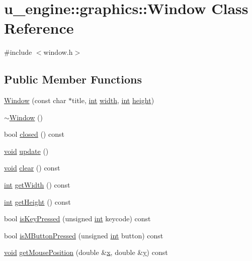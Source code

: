 \hypertarget{classu__engine_1_1graphics_1_1_window}{}\section{u\+\_\+engine\+:\+:graphics\+:\+:Window Class Reference}
\label{classu__engine_1_1graphics_1_1_window}


{\ttfamily \#include $<$window.\+h$>$}

\subsection*{Public Member Functions}
\begin{DoxyCompactItemize}
\item 
\hyperlink{classu__engine_1_1graphics_1_1_window_abffd9ce4556a8020292f0db6e86c4b7b}{Window} (const char $\ast$title, \hyperlink{wglew_8h_a500a82aecba06f4550f6849b8099ca21}{int} \hyperlink{glew_8h_aa105b18f96e6bc2485cb7f576a7fb9ba}{width}, \hyperlink{wglew_8h_a500a82aecba06f4550f6849b8099ca21}{int} \hyperlink{glew_8h_aa214bd63e12f7ddf524c83894fcc69a7}{height})
\item 
\hyperlink{classu__engine_1_1graphics_1_1_window_a8e30906139e8e91cceb32c50c2a44098}{$\sim$\+Window} ()
\item 
bool \hyperlink{classu__engine_1_1graphics_1_1_window_a96d6897109221d2147c9302b52e0e860}{closed} () const 
\item 
\hyperlink{wglew_8h_aeea6e3dfae3acf232096f57d2d57f084}{void} \hyperlink{classu__engine_1_1graphics_1_1_window_a498d5b982b6b7589653a3f60686c089c}{update} ()
\item 
\hyperlink{wglew_8h_aeea6e3dfae3acf232096f57d2d57f084}{void} \hyperlink{classu__engine_1_1graphics_1_1_window_a1bd69497bd45d1265b0bf3bc07f086c4}{clear} () const 
\item 
\hyperlink{wglew_8h_a500a82aecba06f4550f6849b8099ca21}{int} \hyperlink{classu__engine_1_1graphics_1_1_window_aff46afa2292ddca01e3e02fbe37e0173}{get\+Width} () const 
\item 
\hyperlink{wglew_8h_a500a82aecba06f4550f6849b8099ca21}{int} \hyperlink{classu__engine_1_1graphics_1_1_window_ad60ae406aebee2012dd2d71ab08de66f}{get\+Height} () const 
\item 
bool \hyperlink{classu__engine_1_1graphics_1_1_window_a3653c57a4857b352f4460860f2612858}{is\+Key\+Pressed} (unsigned \hyperlink{wglew_8h_a500a82aecba06f4550f6849b8099ca21}{int} keycode) const 
\item 
bool \hyperlink{classu__engine_1_1graphics_1_1_window_a1ce63ea608ff16bfeb6ebbcec26a200d}{is\+M\+Button\+Pressed} (unsigned \hyperlink{wglew_8h_a500a82aecba06f4550f6849b8099ca21}{int} button) const 
\item 
\hyperlink{wglew_8h_aeea6e3dfae3acf232096f57d2d57f084}{void} \hyperlink{classu__engine_1_1graphics_1_1_window_ae49ae110d10fa0741a3da682849b1ff1}{get\+Mouse\+Position} (double \&\hyperlink{glew_8h_ad77deca22f617d3f0e0eb786445689fc}{x}, double \&\hyperlink{glew_8h_a9298c7ad619074f5285b32c6b72bfdea}{y}) const 
\end{DoxyCompactItemize}
